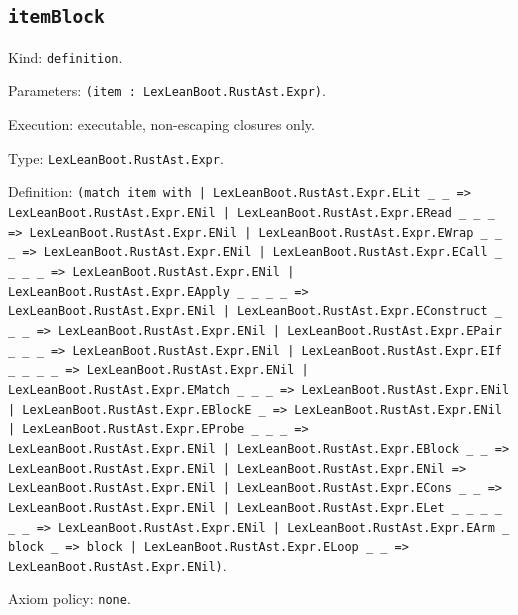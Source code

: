 \documentclass[11pt]{article}
\begin{document}
\subsection*{\texttt{itemBlock}}
\noindent Kind: \texttt{definition}.\par
\noindent Parameters: \texttt{(item : LexLeanBoot.RustAst.Expr)}.\par
\noindent Execution: executable, non-escaping closures only.\par
\noindent Type: \texttt{LexLeanBoot.RustAst.Expr}.\par
\noindent Definition: \texttt{(match item with | LexLeanBoot.RustAst.Expr.ELit \_ \_ => LexLeanBoot.RustAst.Expr.ENil | LexLeanBoot.RustAst.Expr.ERead \_ \_ \_ => LexLeanBoot.RustAst.Expr.ENil | LexLeanBoot.RustAst.Expr.EWrap \_ \_ \_ => LexLeanBoot.RustAst.Expr.ENil | LexLeanBoot.RustAst.Expr.ECall \_ \_ \_ \_ => LexLeanBoot.RustAst.Expr.ENil | LexLeanBoot.RustAst.Expr.EApply \_ \_ \_ \_ => LexLeanBoot.RustAst.Expr.ENil | LexLeanBoot.RustAst.Expr.EConstruct \_ \_ \_ => LexLeanBoot.RustAst.Expr.ENil | LexLeanBoot.RustAst.Expr.EPair \_ \_ \_ => LexLeanBoot.RustAst.Expr.ENil | LexLeanBoot.RustAst.Expr.EIf \_ \_ \_ \_ => LexLeanBoot.RustAst.Expr.ENil | LexLeanBoot.RustAst.Expr.EMatch \_ \_ \_ => LexLeanBoot.RustAst.Expr.ENil | LexLeanBoot.RustAst.Expr.EBlockE \_ => LexLeanBoot.RustAst.Expr.ENil | LexLeanBoot.RustAst.Expr.EProbe \_ \_ \_ => LexLeanBoot.RustAst.Expr.ENil | LexLeanBoot.RustAst.Expr.EBlock \_ \_ => LexLeanBoot.RustAst.Expr.ENil | LexLeanBoot.RustAst.Expr.ENil => LexLeanBoot.RustAst.Expr.ENil | LexLeanBoot.RustAst.Expr.ECons \_ \_ => LexLeanBoot.RustAst.Expr.ENil | LexLeanBoot.RustAst.Expr.ELet \_ \_ \_ \_ \_ \_ => LexLeanBoot.RustAst.Expr.ENil | LexLeanBoot.RustAst.Expr.EArm \_ block \_ => block | LexLeanBoot.RustAst.Expr.ELoop \_ \_ => LexLeanBoot.RustAst.Expr.ENil)}.\par
\noindent Axiom policy: \texttt{none}.\par
\end{document}
